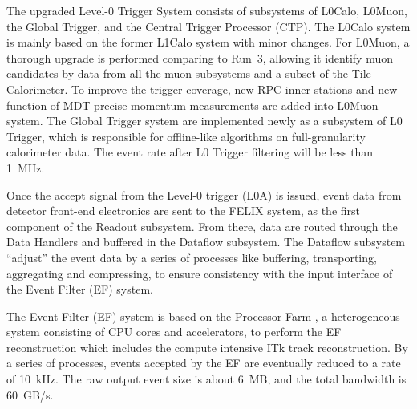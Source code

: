 The upgraded Level-0 Trigger System consists of subsystems of L0Calo, L0Muon, the Global Trigger, and the Central Trigger Processor (CTP). The L0Calo system is mainly based on the former L1Calo system with minor changes. For L0Muon, a thorough upgrade is performed comparing to Run~3, allowing it identify muon candidates by data from all the muon subsystems and a subset of the Tile Calorimeter. To improve the trigger coverage, new RPC inner stations and new function of MDT precise momentum measurements are added into L0Muon system. The Global Trigger system are implemented newly as a subsystem of L0 Trigger, which is responsible for offline-like algorithms on full-granularity calorimeter data. The event rate after L0 Trigger filtering will be less than 1~MHz.

Once the accept signal from the Level-0 trigger (L0A) is issued, event data from detector front-end electronics are sent to the FELIX system, as the first component of the Readout subsystem. From there, data are routed through the Data Handlers and buffered in the Dataflow subsystem. The Dataflow subsystem ``adjust'' the event data by a series of processes like buffering, transporting, aggregating and compressing, to ensure consistency with the input interface of the Event Filter (EF) system.

The Event Filter (EF) system is based on the Processor Farm \cite{TDAQ_TDR_EF}, a heterogeneous system consisting of CPU cores and accelerators, to perform the EF reconstruction which includes the compute intensive ITk track reconstruction. By a series of processes, events accepted by the EF are eventually reduced to a rate of 10~kHz. The raw output event size is about 6~MB, and the total bandwidth is 60~GB/s.

